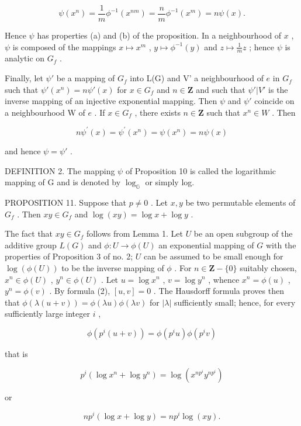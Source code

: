 \[
\psi (x ^ {n}) = \frac {1}{m} \phi^ {- 1} (x ^ {n m}) = \frac {n}{m} \phi^ {- 1} (x ^ {m}) = n \psi (x).
\]

Hence \(\psi\) has properties (a) and (b) of the proposition. In a neighbourhood of \(x\) , \(\psi\) is composed of the mappings \(x \mapsto x^m\) , \(y \mapsto \phi^{-1}(y)\) and \(z \mapsto \frac{1}{m} z\) ; hence \(\psi\) is analytic on \(G_f\) .

Finally, let \(\psi'\) be a mapping of \(G_f\) into L(G) and V' a neighbourhood of \(e\) in \(G_f\) such that \(\psi'(x^n) = n\psi'(x)\) for \(x \in G_f\) and \(n \in \mathbf{Z}\) and such that \(\psi'|V'\) is the inverse mapping of an injective exponential mapping. Then \(\psi\) and \(\psi'\) coincide on a neighbourhood W of \(e\) . If \(x \in G_f\) , there exists \(n \in \mathbf{Z}\) such that \(x^n \in W\) . Then

\[
n \psi^ {\prime} (x) = \psi^ {\prime} (x ^ {n}) = \psi (x ^ {n}) = n \psi (x)
\]

and hence \(\psi = \psi'\) .

DEFINITION 2. The mapping \(\psi\) of Proposition 10 is called the logarithmic mapping of G and is denoted by \(\log_{\mathbb{G}}\) or simply log.

PROPOSITION 11. Suppose that \(p \neq 0\) . Let \(x, y\) be two permutable elements of \(G_f\) . Then \(xy \in G_f\) and \(\log(xy) = \log x + \log y\) .

The fact that \(xy \in G_f\) follows from Lemma 1. Let \(U\) be an open subgroup of the additive group \(L(G)\) and \(\phi: U \to \phi(U)\) an exponential mapping of \(G\) with the properties of Proposition 3 of no. 2; \(U\) can be assumed to be small enough for \(\log(\phi(U))\) to be the inverse mapping of \(\phi\) . For \(n \in \mathbf{Z} - \{0\}\) suitably chosen, \(x^n \in \phi(U)\) , \(y^n \in \phi(U)\) . Let \(u = \log x^n\) , \(v = \log y^n\) , whence \(x^n = \phi(u)\) , \(y^n = \phi(v)\) . By formula (2), \([u,v] = 0\) . The Hausdorff formula proves then that \(\phi(\lambda(u + v)) = \phi(\lambda u)\phi(\lambda v)\) for \(|\lambda|\) sufficiently small; hence, for every sufficiently large integer \(i\) ,

\[
\phi (p ^ {i} (u + v)) = \phi (p ^ {i} u) \phi (p ^ {i} v)
\]

that is

\[
p ^ {i} (\log x ^ {n} + \log y ^ {n}) = \log (x ^ {n p ^ {i}} y ^ {n p ^ {i}})
\]

or

\[
n p ^ {i} (\log x + \log y) = n p ^ {i} \log (x y).
\]

